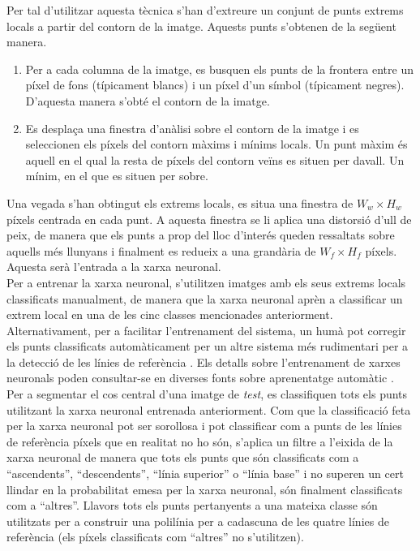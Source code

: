 Per tal d'utilitzar aquesta tècnica s'han d'extreure un conjunt de punts extrems locals a partir del contorn de la imatge. Aquests punts s'obtenen de la següent manera.
\begin{enumerate}
\item Per a cada columna de la imatge, es busquen els punts de la frontera entre un píxel de fons (típicament blancs) i un píxel d'un símbol (típicament negres). D'aquesta manera s'obté el contorn de la imatge.
\item Es desplaça una finestra d'anàlisi sobre el contorn de la imatge i es seleccionen els píxels del contorn màxims i mínims locals. Un punt màxim és aquell en el qual la resta de píxels del contorn veïns es situen per davall. Un mínim, en el que es situen per sobre.
\end{enumerate}

Una vegada s'han obtingut els extrems locals, es situa una finestra de $W_w \times H_w$ píxels centrada en cada punt. A aquesta finestra se li aplica una distorsió d'ull de peix, de manera que els punts a prop del lloc d'interés queden ressaltats sobre aquells més llunyans i finalment es redueix a una grandària de $W_f \times H_f$ píxels. Aquesta serà l'entrada a la xarxa neuronal.\\

Per a entrenar la xarxa neuronal, s'utilitzen imatges amb els seus extrems locals classificats manualment, de manera que la xarxa neuronal aprèn a classificar un extrem local en una de les cinc classes mencionades anteriorment. Alternativament, per a facilitar l'entrenament del sistema, un humà pot corregir els punts classificats automàticament per un altre sistema més rudimentari per a la detecció de les línies de referència \cite{DBLP:conf/pris/Gorbe-MoyaEZB08}. Els detalls sobre l'entrenament de xarxes neuronals poden consultar-se en diverses fonts sobre aprenentatge automàtic \cite{DH73,bishop2006pattern,murphy2012machine}.\\

Per a segmentar el cos central d'una imatge de \emph{test}, es classifiquen tots els punts utilitzant la xarxa neuronal entrenada anteriorment. Com que la classificació feta per la xarxa neuronal pot ser sorollosa i pot classificar com a punts de les línies de referència píxels que en realitat no ho són, s'aplica un filtre a l'eixida de la xarxa neuronal de manera que tots els punts que són classificats com a ``ascendents'', ``descendents'', ``línia superior'' o ``línia base'' i no superen un cert llindar en la probabilitat emesa per la xarxa neuronal, són finalment classificats com a ``altres''. Llavors tots els punts pertanyents a una mateixa classe són utilitzats per a construir una polilínia per a cadascuna de les quatre línies de referència (els píxels classificats com ``altres'' no s'utilitzen).\\


